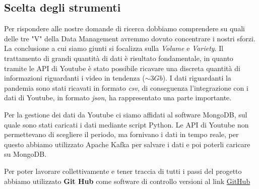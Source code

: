 \subsection*{Scelta degli strumenti}
Per rispondere alle nostre domande di ricerca dobbiamo comprendere su quali delle tre "V" della Data Management avremmo dovuto concentrare i nostri sforzi. La conclusione a cui siamo giunti si focalizza sulla \textit{Volume} e \textit{Variety}. Il trattamento di grandi quantità di dati è risultato fondamentale, in quanto tramite le API di Youtube è stato possibile ricavare una discreta quantità di informazioni riguardanti i video in tendenza ($\sim 3Gb$). I dati riguardanti la pandemia sono stati ricavati in formato \textit{csv}, di conseguenza l'integrazione con i dati di Youtube, in formato \textit{json}, ha rappresentato una parte importante.

Per la gestione dei dati da Youtube ci siamo affidati al software MongoDB, sul quale sono stati caricati i dati mediante script Python. Le API di Youtube non permettevano di scegliere il periodo, ma fornivano i dati in tempo reale, per questo abbiamo utilizzato Apache Kafka per salvare i dati e poi poterli caricare su MongoDB.
 
Per poter lavorare collettivamente e tener traccia di tutti i passi del progetto abbiamo utilizzato \textbf{Git Hub} come software di controllo versioni al link \href{https://github.com/fedelux3/Youtube_trending_analysis}{GitHub} 
